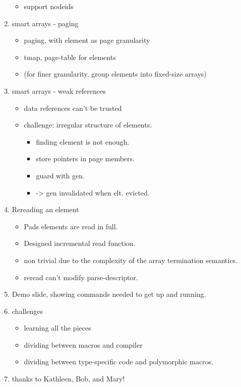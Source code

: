 \documentclass{article}
\begin{document}
\begin{enumerate}
\begin{itemize}
  \item support nodeids
  \end{itemize}
\item smart arrays - paging
  \begin{itemize}
  \item paging, with element as page granularity
  \item tmap, page-table for elements 
  \item (for finer granularity, group
    elements into fixed-size arrays)
  \end{itemize}
\item smart arrays - weak references
  \begin{itemize}
  \item data references can't be trusted
  \item challenge: irregular structure of elements. 
    \begin{itemize}
    \item finding element is not enough.
    \item store pointers in page members.
    \item guard with gen.
    \item -> gen invalidated when elt. evicted.
    \end{itemize}
  \end{itemize}
\item Rereading an element
  \begin{itemize}
  \item Pads elements are read in full.
  \item Designed incremental read function.
  \item non trivial due to the complexity of the array termination semantics.
  \item reread can't modify parse-descriptor.
  \end{itemize}
\item Demo slide, showing commands needed to get up
  and running.
\item challenges
  \begin{itemize}
  \item learning all the pieces
  \item dividing between macros and compiler
  \item dividing between type-specific code and polymorphic macros.
  \end{itemize}
\item thanks to Kathleen, Bob, and Mary!
\end{enumerate}
\end{document}
